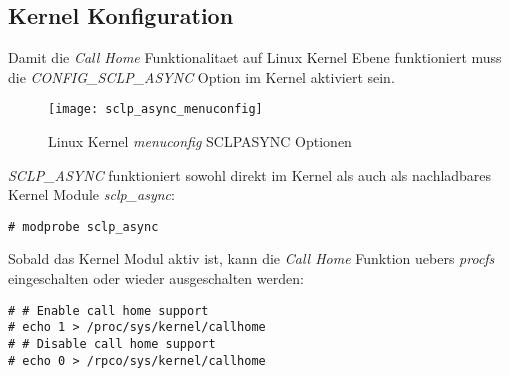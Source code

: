 \subsection{Kernel Konfiguration}

Damit die \textit{Call Home} Funktionalitaet auf Linux Kernel Ebene funktioniert muss die \textit{CONFIG\_SCLP\_ASYNC} Option im Kernel aktiviert sein.

\begin{figure}[h!]
\centering
\texttt{[image: sclp\_async\_menuconfig]}
\caption{Linux Kernel \textit{menuconfig} SCLP\textunderscore ASYNC Optionen}
\label{fig:SCLPASYNC}
\end{figure}

\textit{SCLP\_ASYNC} funktioniert sowohl direkt im Kernel als auch als nachladbares Kernel Module \textit{sclp\_async}:

\begin{lstlisting}
# modprobe sclp_async
\end{lstlisting}

Sobald das Kernel Modul aktiv ist, kann die \textit{Call Home} Funktion uebers \textit{procfs} eingeschalten oder wieder ausgeschalten werden:\cite{IBMCallHome}

\begin{lstlisting}
# # Enable call home support
# echo 1 > /proc/sys/kernel/callhome
# # Disable call home support
# echo 0 > /rpco/sys/kernel/callhome
\end{lstlisting}
